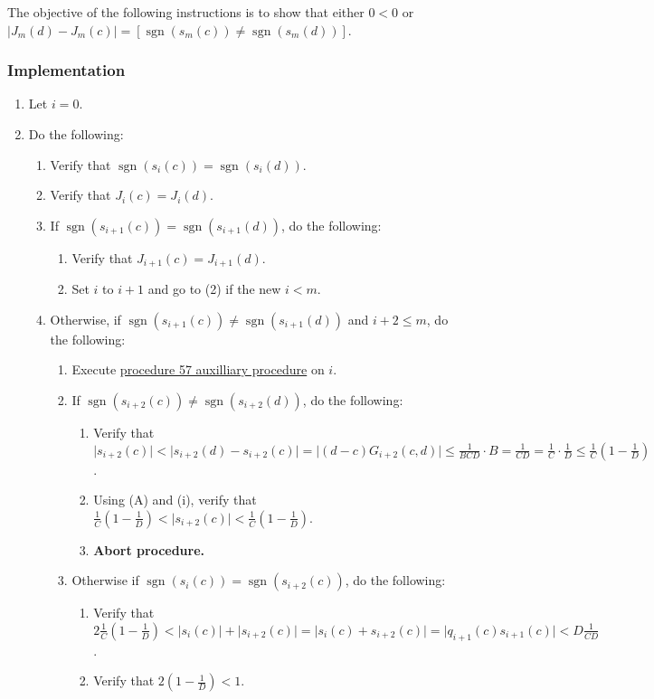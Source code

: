 \documentclass[twocolumn]{article}
\DeclareMathOperator{\sgn}{sgn}
\newcommand{\implementation}{\subsubsection*{Implementation}}
\begin{document}
				The objective of the following instructions is to show that either $0<0$ or $\lvert J_m(d)-J_m(c)\rvert=[\sgn(s_m(c))\ne\sgn(s_m(d))]$.
			\implementation
				\begin{enumerate}
					\item Let $i=0$.
					\item Do the following:
					\begin{enumerate}
						\item Verify that $\sgn(s_i(c))=\sgn(s_i(d))$.
						\item Verify that $J_i(c)=J_i(d)$.
						\item If $\sgn(s_{i+1}(c))=\sgn(s_{i+1}(d))$, do the following:
						\begin{enumerate}
							\item Verify that $J_{i+1}(c)=J_{i+1}(d)$.
							\item Set $i$ to $i+1$ and go to (2) if the new $i<m$.
						\end{enumerate}
						\item Otherwise, if $\sgn(s_{i+1}(c))\ne\sgn(s_{i+1}(d))$ and $i+2\le m$, do the following:
						\begin{enumerate}
							\item Execute \hyperref[sec:procedure 57 auxilliary procedure]{procedure 57 auxilliary procedure} on $i$.
							\item If $\sgn(s_{i+2}(c))\ne\sgn(s_{i+2}(d))$, do the following:
							\begin{enumerate}
								\item Verify that $\lvert s_{i+2}(c)\rvert<\lvert s_{i+2}(d)-s_{i+2}(c)\rvert=\lvert (d-c)G_{i+2}(c,d)\rvert\le\frac{1}{BCD}\cdot B=\frac{1}{CD}=\frac{1}{C}\cdot\frac{1}{D}\le\frac{1}{C}(1-\frac{1}{D})$.
								\item Using (A) and (i), verify that $\frac{1}{C}(1-\frac{1}{D})<\lvert s_{i+2}(c)\rvert<\frac{1}{C}(1-\frac{1}{D})$.
								\item \textbf{Abort procedure.}
							\end{enumerate}
							\item Otherwise if $\sgn(s_i(c))=\sgn(s_{i+2}(c))$, do the following:
							\begin{enumerate}
								\item Verify that $2\frac{1}{C}(1-\frac{1}{D})<\lvert s_i(c)\rvert+\lvert s_{i+2}(c)\rvert=\lvert s_i(c)+s_{i+2}(c)\rvert=\lvert q_{i+1}(c)s_{i+1}(c)\rvert<D\frac{1}{CD}$.
								\item Verify that $2(1-\frac{1}{D})<1$.

\end{enumerate}
\end{enumerate}
\end{enumerate}
\end{enumerate}
\end{document}
